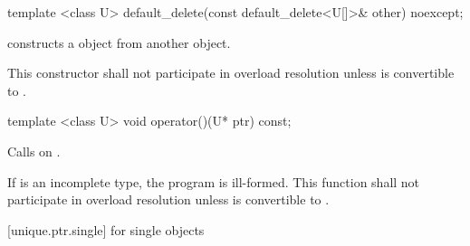 \begin{itemdecl}
template <class U> default_delete(const default_delete<U[]>& other) noexcept;
\end{itemdecl}

\begin{itemdescr}
\pnum
\effects
constructs a  object from another  object.

\pnum
\remarks
This constructor shall not participate in overload resolution unless  is
convertible to .
\end{itemdescr}

%
\begin{itemdecl}
template <class U> void operator()(U* ptr) const;
\end{itemdecl}

\begin{itemdescr}
\pnum
\effects
Calls  on .

\pnum
\remarks If  is an incomplete type, the program is ill-formed.
This function shall not participate in overload resolution
unless  is convertible to .
\end{itemdescr}

[unique.ptr.single]{ for single objects}

